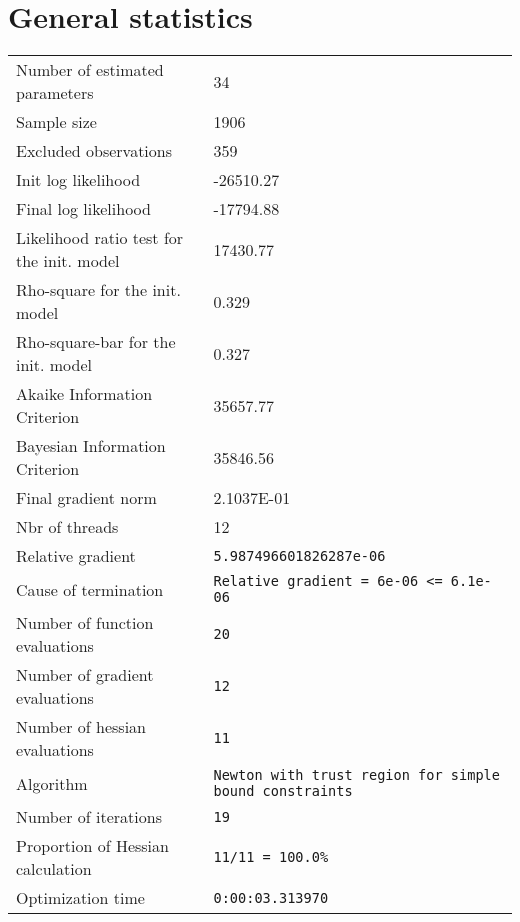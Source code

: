 



\section{General statistics}
\begin{tabular}{ll}
Number of estimated parameters & 34 \\
Sample size & 1906 \\
Excluded observations & 359 \\
Init log likelihood & -26510.27 \\
Final log likelihood & -17794.88 \\
Likelihood ratio test for the init. model & 17430.77 \\
Rho-square for the init. model & 0.329 \\
Rho-square-bar for the init. model & 0.327 \\
Akaike Information Criterion & 35657.77 \\
Bayesian Information Criterion & 35846.56 \\
Final gradient norm & 2.1037E-01 \\
Nbr of threads & 12 \\
Relative gradient & \verb$5.987496601826287e-06$ \\
Cause of termination & \verb$Relative gradient = 6e-06 <= 6.1e-06$ \\
Number of function evaluations & \verb$20$ \\
Number of gradient evaluations & \verb$12$ \\
Number of hessian evaluations & \verb$11$ \\
Algorithm & \verb$Newton with trust region for simple bound constraints$ \\
Number of iterations & \verb$19$ \\
Proportion of Hessian calculation & \verb$11/11 = 100.0%$ \\
Optimization time & \verb$0:00:03.313970$ \\
\end{tabular}

